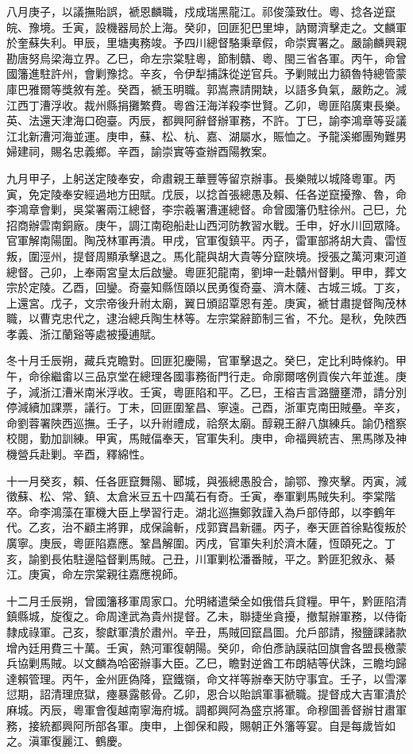 \begin{pinyinscope}
八月庚子，以議撫貽誤，褫恩麟職，戍成瑞黑龍江。祁俊藻致仕。粵、捻各逆竄皖、豫境。壬寅，設機器局於上海。癸卯，回匪犯巴里坤，訥爾濟擊走之。文麟軍於奎蘇失利。甲辰，里塘夷務竣。予四川總督駱秉章假，命崇實署之。嚴諭麟興親勘唐努烏梁海立界。乙巳，命左宗棠駐粵，節制贛、粵、閩三省各軍。丙午，命曾國籓進駐許州，會剿豫捻。辛亥，令伊犁捕誅從逆官兵。予剿賊出力額魯特總管蒙庫巴雅爾等獎敘有差。癸酉，褫玉明職。郭嵩燾請開缺，以語多負氣，嚴飭之。減江西丁漕浮收。裁州縣捐攤繁費。粵酋汪海洋殺李世賢。乙卯，粵匪陷廣東長樂。英、法還天津海口砲臺。丙辰，都興阿辭督辦軍務，不許。丁巳，諭李鴻章等妥議江北新漕河海並運。庚申，蘇、松、杭、嘉、湖屬水，賑恤之。予龍溪鄉團殉難男婦建祠，賜名忠義鄉。辛酉，諭崇實等查辦酉陽教案。

九月甲子，上躬送定陵奉安，命肅親王華豐等留京辦事。長樂賊以城降粵軍。丙寅，免定陵奉安經過地方田賦。戊辰，以捻首張總愚及賴、任各逆竄擾豫、魯，命李鴻章會剿，吳棠署兩江總督，李宗羲署漕運總督。命曾國籓仍駐徐州。己巳，允招商辦雲南銅廠。庚午，調江南砲船赴山西河防教習水戰。壬申，好水川回眾降。官軍解南陽圍。陶茂林軍再潰。甲戌，官軍復鎮平。丙子，雷軍部將胡大貴、雷恆叛，圍涇州，提督周顯承擊退之。馬化龍與胡大貴等分竄陜境。授張之萬河東河道總督。己卯，上奉兩宮皇太后啟鑾。粵匪犯龍南，劉坤一赴贛州督剿。甲申，葬文宗於定陵。乙酉，回鑾。奇臺知縣恆頤以民勇復奇臺、濟木薩、古城三城。丁亥，上還宮。戊子，文宗帝後升祔太廟，翼日頒詔覃恩有差。庚寅，褫甘肅提督陶茂林職，以曹克忠代之，逮治總兵陶生林等。左宗棠辭節制三省，不允。是秋，免陜西孝義、浙江蘭谿等處被擾逋賦。

冬十月壬辰朔，藏兵克瞻對。回匪犯慶陽，官軍擊退之。癸巳，定比利時條約。甲午，命徐繼畬以三品京堂在總理各國事務衙門行走。命廓爾喀例貢俟六年並進。庚子，減浙江漕米南米浮收。壬寅，粵匪陷和平。乙巳，王榕吉言潞鹽壅滯，請分別停減續加課票，議行。丁未，回匪圍鞏昌、寧遠。己酉，浙軍克南田賊壘。辛亥，命劉蓉署陜西巡撫。壬子，以升祔禮成，祫祭太廟。醇親王辭八旗練兵。諭仍稽察校閱，勤加訓練。甲寅，馬賊偪奉天，官軍失利。庚申，命福興統吉、黑馬隊及神機營兵赴剿。辛酉，釋綿性。

十一月癸亥，賴、任各匪竄舞陽、郾城，與張總愚股合，諭鄂、豫夾擊。丙寅，減徵蘇、松、常、鎮、太倉米豆五十四萬石有奇。壬寅，奉軍剿馬賊失利。李棠階卒。命李鴻藻在軍機大臣上學習行走。湖北巡撫鄭敦謹入為戶部侍郎，以李鶴年代。乙亥，治不顧主將罪，成保論斬，戍郭寶昌新疆。丙子，奉天匪首徐點復叛於廣寧。庚辰，粵匪陷嘉應。鞏昌解圍。丙戌，官軍失利於濟木薩，恆頤死之。丁亥，諭劉長佑駐邊隘督剿馬賊。己丑，川軍剿松潘番賊，平之。黔匪犯敘永、綦江。庚寅，命左宗棠親往嘉應視師。

十二月壬辰朔，曾國籓移軍周家口。允明緒遣榮全如俄借兵貸糧。甲午，黔匪陷清鎮縣城，旋復之。命周達武為貴州提督。乙未，聯捷坐貪擾，撤幫辦軍務，以侍衛隸成祿軍。己亥，黎獻軍潰於肅州。辛丑，馬賊回竄昌圖。允戶部請，撥鹽課諸款增內廷用費三十萬。壬寅，熱河軍復朝陽。癸卯，命伯彥訥謨祜回旗會各盟長檄蒙兵協剿馬賊。以文麟為哈密辦事大臣。乙巳，瞻對逆酋工布朗結等伏誅，三瞻均歸達賴管理。丙午，金州匪偽降，竄鐵嶺，命文祥等辦奉天防守事宜。壬子，以雪澤愆期，詔清理庶獄，瘞暴露骸骨。乙卯，恩合以貽誤軍事褫職。提督成大吉軍潰於麻城。丙辰，粵軍會復越南寧海府城。調都興阿為盛京將軍。命穆圖善督辦甘肅軍務，接統都興阿所部各軍。庚申，上御保和殿，賜朝正外籓等宴。自是每歲皆如之。滇軍復麗江、鶴慶。


\end{pinyinscope}
